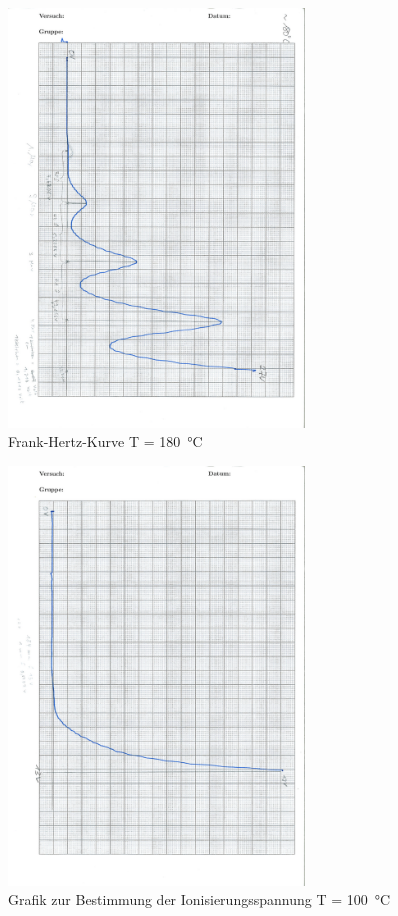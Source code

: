 \documentclass[a4,10pt]{article}
\newcommand{\V}{V601}
\begin{document}
\begin{figure}[h!]
	\centering
	\includegraphics[angle=90,origin=c, width=0.7\textwidth]{scan/Messung3.pdf}
	\caption{Frank-Hertz-Kurve T = \SI{180}{\celsius}}
	\label{fig:messung3}
\end{figure}
\begin{figure}[h!]
	\centering
	\includegraphics[angle=90,origin=c, width=0.7\textwidth]{scan/Messung4.pdf}
	\caption{Grafik zur Bestimmung der Ionisierungsspannung T = \SI{100}{\celsius}}
	\label{fig:messung4}
\end{figure}

\clearpage
\listoftodos
\listoffigures
\listoftables
\clearpage
\printbibliography[title = Literaturverzeichnis]
\end{document}
